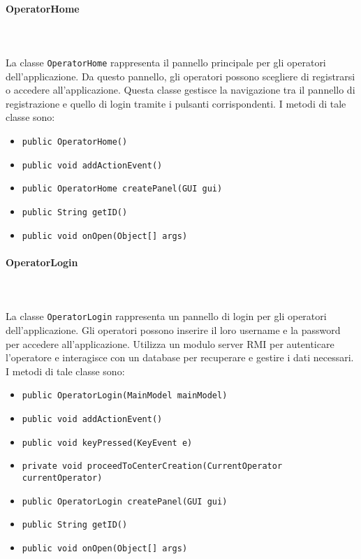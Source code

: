 \paragraph{OperatorHome}\\
\\
La classe \texttt{OperatorHome} rappresenta il pannello principale per gli operatori dell'applicazione.
Da questo pannello, gli operatori possono scegliere di registrarsi o accedere all'applicazione. 
Questa classe gestisce la navigazione tra il pannello di registrazione e quello di login tramite i pulsanti corrispondenti.
I metodi di tale classe sono:
\begin{itemize}
    \item \texttt{public OperatorHome()}
    \item \texttt{public void addActionEvent()}
    \item \texttt{public OperatorHome createPanel(GUI gui)}
    \item \texttt{public String getID()}
    \item \texttt{public void onOpen(Object[] args)}
\end{itemize}

\paragraph{OperatorLogin}\\
\\
La classe \texttt{OperatorLogin} rappresenta un pannello di login per gli operatori dell'applicazione.
Gli operatori possono inserire il loro username e la password per accedere all'applicazione. 
Utilizza un modulo server RMI per autenticare l'operatore e interagisce con un database per recuperare e gestire i dati necessari.
I metodi di tale classe sono:
\begin{itemize}
    \item \texttt{public OperatorLogin(MainModel mainModel)}
    \item \texttt{public void addActionEvent()}
    \item \texttt{public void keyPressed(KeyEvent e)}
    \item \texttt{private void proceedToCenterCreation(CurrentOperator currentOperator)}
    \item \texttt{public OperatorLogin createPanel(GUI gui)}
    \item \texttt{public String getID()}
    \item \texttt{public void onOpen(Object[] args)}
\end{itemize}

